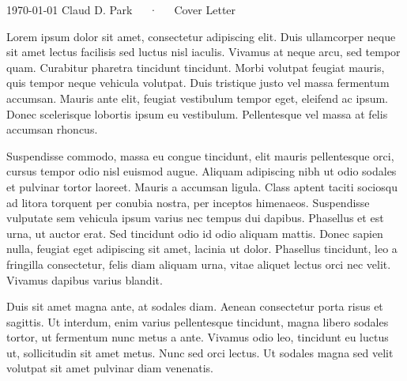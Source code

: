 \documentclass[11pt, a4paper]{classic-professional}
\begin{document}
\makecvheader[R]

\makecvfooter
  {\today}
  {Claud D. Park~~~·~~~Cover Letter}
  {}

\makelettertitle

\begin{cvletter}

Lorem ipsum dolor sit amet, consectetur adipiscing elit. Duis ullamcorper neque sit amet lectus facilisis sed luctus nisl iaculis. Vivamus at neque arcu, sed tempor quam. Curabitur pharetra tincidunt tincidunt. Morbi volutpat feugiat mauris, quis tempor neque vehicula volutpat. Duis tristique justo vel massa fermentum accumsan. Mauris ante elit, feugiat vestibulum tempor eget, eleifend ac ipsum. Donec scelerisque lobortis ipsum eu vestibulum. Pellentesque vel massa at felis accumsan rhoncus.

Suspendisse commodo, massa eu congue tincidunt, elit mauris pellentesque orci, cursus tempor odio nisl euismod augue. Aliquam adipiscing nibh ut odio sodales et pulvinar tortor laoreet. Mauris a accumsan ligula. Class aptent taciti sociosqu ad litora torquent per conubia nostra, per inceptos himenaeos. Suspendisse vulputate sem vehicula ipsum varius nec tempus dui dapibus. Phasellus et est urna, ut auctor erat. Sed tincidunt odio id odio aliquam mattis. Donec sapien nulla, feugiat eget adipiscing sit amet, lacinia ut dolor. Phasellus tincidunt, leo a fringilla consectetur, felis diam aliquam urna, vitae aliquet lectus orci nec velit. Vivamus dapibus varius blandit.

Duis sit amet magna ante, at sodales diam. Aenean consectetur porta risus et sagittis. Ut interdum, enim varius pellentesque tincidunt, magna libero sodales tortor, ut fermentum nunc metus a ante. Vivamus odio leo, tincidunt eu luctus ut, sollicitudin sit amet metus. Nunc sed orci lectus. Ut sodales magna sed velit volutpat sit amet pulvinar diam venenatis.

\end{cvletter}


\makeletterclosing
\end{document}
